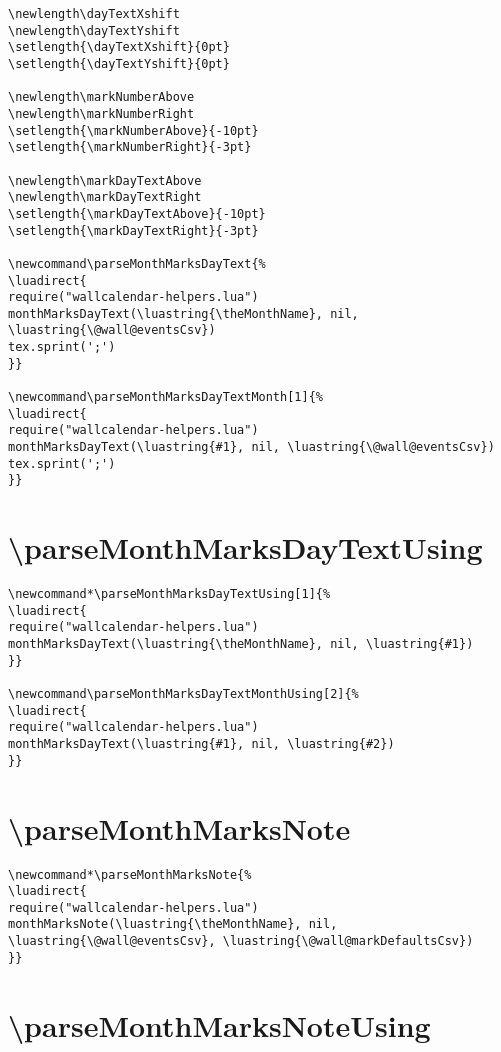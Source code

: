 \documentclass[11pt,oneside]{memoir-article}
\begin{document}
\begin{verbatim}
\newlength\dayTextXshift
\newlength\dayTextYshift
\setlength{\dayTextXshift}{0pt}
\setlength{\dayTextYshift}{0pt}

\newlength\markNumberAbove
\newlength\markNumberRight
\setlength{\markNumberAbove}{-10pt}
\setlength{\markNumberRight}{-3pt}

\newlength\markDayTextAbove
\newlength\markDayTextRight
\setlength{\markDayTextAbove}{-10pt}
\setlength{\markDayTextRight}{-3pt}

\newcommand\parseMonthMarksDayText{%
\luadirect{
require("wallcalendar-helpers.lua")
monthMarksDayText(\luastring{\theMonthName}, nil, \luastring{\@wall@eventsCsv})
tex.sprint(';')
}}

\newcommand\parseMonthMarksDayTextMonth[1]{%
\luadirect{
require("wallcalendar-helpers.lua")
monthMarksDayText(\luastring{#1}, nil, \luastring{\@wall@eventsCsv})
tex.sprint(';')
}}
\end{verbatim}

\section{\textbackslash parseMonthMarksDayTextUsing}
\label{sec:orgcf04e30}

\begin{verbatim}
\newcommand*\parseMonthMarksDayTextUsing[1]{%
\luadirect{
require("wallcalendar-helpers.lua")
monthMarksDayText(\luastring{\theMonthName}, nil, \luastring{#1})
}}

\newcommand\parseMonthMarksDayTextMonthUsing[2]{%
\luadirect{
require("wallcalendar-helpers.lua")
monthMarksDayText(\luastring{#1}, nil, \luastring{#2})
}}
\end{verbatim}

\section{\textbackslash parseMonthMarksNote}
\label{sec:orga2e07dc}

\begin{verbatim}
\newcommand*\parseMonthMarksNote{%
\luadirect{
require("wallcalendar-helpers.lua")
monthMarksNote(\luastring{\theMonthName}, nil, \luastring{\@wall@eventsCsv}, \luastring{\@wall@markDefaultsCsv})
}}
\end{verbatim}

\section{\textbackslash parseMonthMarksNoteUsing}
\label{sec:org2e41aed}
\end{document}
